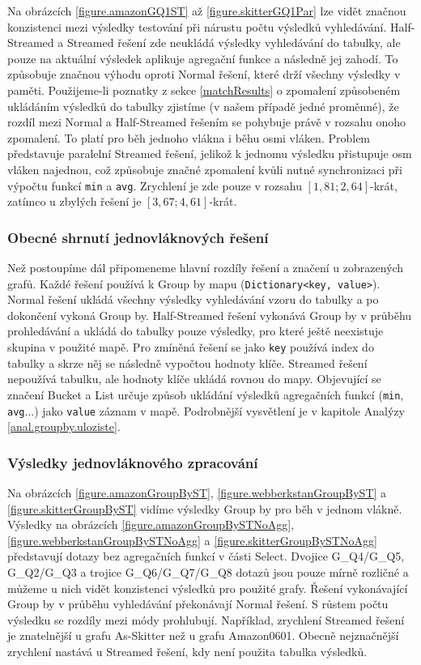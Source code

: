 Na obrázcích \ref{figure.amazonGQ1ST} až \ref{figure.skitterGQ1Par} lze vidět značnou konzistenci mezi výsledky testování při nárustu počtu výsledků vyhledávání.
Half-Streamed a Streamed řešení zde neukládá výsledky vyhledávání do tabulky, ale pouze na aktuální výsledek aplikuje agregační funkce a následně jej zahodí.
To způsobuje značnou výhodu oproti Normal řešení, které drží všechny výsledky v paměti.
Použijeme-li poznatky z sekce \ref{matchResults} o zpomalení způsobeném ukládáním výsledků do tabulky zjistíme (v našem případě jedné proměnné), že rozdíl mezi Normal a Half-Streamed řešením se pohybuje právě v rozsahu onoho zpomalení.
To platí pro běh jednoho vlákna i běhu osmi vláken. 
Problem představuje paralelní Streamed řešení, jelikož k jednomu výsledku přistupuje osm vláken najednou, což způsobuje značné zpomalení kvůli nutné synchronizaci při výpočtu funkcí \verb+min+ a \verb+avg+. 
Zrychlení je zde pouze v rozsahu $[1,81; 2,64]$-krát, zatímco u zbylých řešení je $[3,67; 4,61]$-krát.

\subsubsection{Obecné shrnutí jednovláknových řešení}

Než postoupíme dál připomeneme hlavní rozdíly řešení a značení u zobrazených grafů. 
Každé řešení používá k Group by mapu (\verb+Dictionary<key, value>+).
Normal řešení ukládá všechny výsledky vyhledávání vzoru do tabulky a po dokončení vykoná Group by. 
Half-Streamed řešení vykonává Group by v průběhu prohledávání a ukládá do tabulky pouze výsledky, pro které ještě neexistuje skupina v použité mapě.
Pro zmíněná řešení se jako \verb+key+ používá index do tabulky a skrze něj se následně vypočtou hodnoty klíče.
Streamed řešení nepoužívá tabulku, ale hodnoty klíče ukládá rovnou do mapy. 
Objevující se značení Bucket a List určuje způsob ukládání výsledků agregačních funkcí (\verb+min+, \verb+avg+...) jako \verb+value+ záznam v mapě.
Podrobnější vysvětlení je v kapitole Analýzy \ref{anal.groupby.uloziste}.


\subsubsection{Výsledky jednovláknového zpracování}

Na obrázcích \ref{figure.amazonGroupByST}, \ref{figure.webberkstanGroupByST} a \ref{figure.skitterGroupByST} vidíme výsledky Group by pro běh v jednom vlákně.
Výsledky na obrázcích \ref{figure.amazonGroupBySTNoAgg}, \ref{figure.webberkstanGroupBySTNoAgg} a \ref{figure.skitterGroupBySTNoAgg} představují dotazy bez agregačních funkcí v části Select.
Dvojice G\_Q4/G\_Q5, G\_Q2/G\_Q3 a trojice G\_Q6/G\_Q7/G\_Q8 dotazů jsou pouze mírně rozličné a můžeme u nich vidět konzistenci výsledků pro použité grafy.
Řešení vykonávající Group by v průběhu vyhledávání překonávají Normal řešení.
S růstem počtu výsledku se rozdíly mezi módy prohlubují. 
Například, zrychlení Streamed řešení je znatelnější u grafu As-Skitter než u grafu Amazon0601. 
Obecně nejznačnější zrychlení nastává u Streamed řešení, kdy není použita tabulka výsledků.

